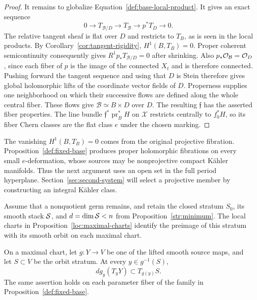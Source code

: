 \begin{proof}
It remains to globalize Equation~\eqref{def:base-local-product}.
It gives an exact sequence
\[
 0\longrightarrow T_{\mathcal B/D}
 \longrightarrow T_{\mathcal B}
 \longrightarrow p^*T_D\longrightarrow0.
\]
The relative tangent sheaf is flat over $D$ and restricts to $T_B$,
as is seen in the local products.  By
Corollary~\ref{cor:tangent-rigidity}, $H^1(B,T_B)=0$.
Proper coherent semicontinuity consequently gives
$R^1p_*T_{\mathcal B/D}=0$ after shrinking.  Also
$p_*\mathcal O_{\mathcal B}=\mathcal O_D$, since each fiber of $p$ is the image
of the connected $X_t$ and is therefore connected.
Pushing forward the tangent sequence and using that $D$ is Stein
therefore gives global holomorphic lifts of the coordinate vector
fields of $D$.  Properness supplies one neighborhood on which
their successive flows are defined along the whole central fiber.
These flows give $\mathcal B\simeq B\times D$ over $D$.
The resulting $\mathfrak f$ has the asserted fiber properties.
The line bundle $\mathfrak f^*\operatorname{pr}_B^*H$ on
$\mathcal X$ restricts centrally to $f_0^*H$, so its fiber Chern
classes are the flat class $e$ under the chosen marking.
\end{proof}

\begin{remark}\label{def:nonprojective-warning}
The vanishing $H^1(B,T_B)=0$ comes from the original projective
fibration.  Proposition~\ref{def:fixed-base} produces proper
holomorphic fibrations on every small $e$-deformation, whose sources
may be nonprojective compact K\"ahler manifolds.  Thus the next
argument uses an open set in the full period hyperplane.
Section~\ref{sec:second-system} will select a projective member by
constructing an integral K\"ahler class.
\end{remark}

Assume that a nonquotient germ remains, and retain the closed stratum
$S_0$, its smooth stack $\mathcal S$, and $d=\dim\mathcal S<n$ from
Proposition~\ref{str:minimum}.  The local charts in
Proposition~\ref{loc:maximal-charts} identify the preimage of this
stratum with its smooth orbit on each maximal chart.

\begin{lemma}\label{def:tangent-to-orbit}
On a maximal chart, let $g:Y\to V$ be one of the lifted smooth
source maps, and let $S\subset V$ be the orbit stratum.  At every
$y\in g^{-1}(S)$,
\begin{equation}\label{def:differential-tangency}
                  dg_y(T_yY)\subset T_{g(y)}S.
\end{equation}
The same assertion holds on each parameter fiber of the family in
Proposition~\ref{def:fixed-base}.
\end{lemma}

